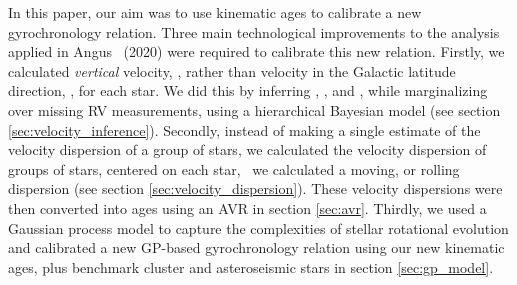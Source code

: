 In this paper, our aim was to use kinematic ages to calibrate a new
gyrochronology relation.
Three main technological improvements to the analysis applied in Angus \etal\
(2020) were required to calibrate this new relation.
Firstly, we calculated {\it vertical} velocity, \vz, rather than velocity in
the Galactic latitude direction, \vb, for each star.
We did this by inferring \vx, \vy, and \vz, while marginalizing over missing
RV measurements, using a hierarchical Bayesian model (see section
\ref{sec:velocity_inference}).
Secondly, instead of making a single estimate of the velocity dispersion of a
group of stars, we calculated the velocity dispersion of groups of stars,
centered on each star, \ie\ we calculated a moving, or rolling dispersion (see
section \ref{sec:velocity_dispersion}).
These velocity dispersions were then converted into ages using an AVR
\citep{yu2018} in section \ref{sec:avr}.
Thirdly, we used a Gaussian process model to capture the complexities of
stellar rotational evolution and calibrated a new GP-based gyrochronology
relation using our new kinematic ages, plus benchmark cluster and
asteroseismic stars in section \ref{sec:gp_model}.
